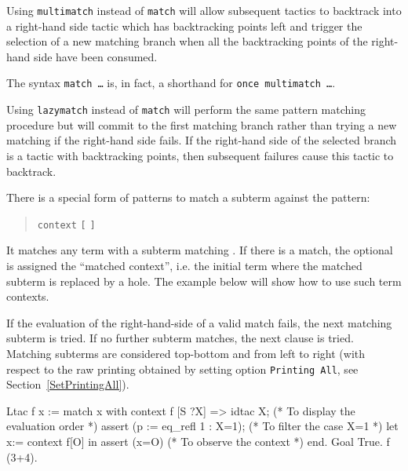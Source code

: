\begin{Variants}

\item {}
Using {\tt multimatch} instead of {\tt match} will allow subsequent
tactics to backtrack into a right-hand side tactic which has
backtracking points left and trigger the selection of a new matching
branch when all the backtracking points of the right-hand side have
been consumed.

The syntax {\tt match \ldots} is, in fact, a shorthand for
{\tt once multimatch \ldots}.

\item {}
Using {\tt lazymatch} instead of {\tt match} will perform the same
pattern matching procedure but will commit to the first matching
branch rather than trying a new matching if the right-hand side
fails. If the right-hand side of the selected branch is a tactic with
backtracking points, then subsequent failures cause this tactic to
backtrack.

\item {}
There is a special form of patterns to match a subterm against the
pattern:
\begin{quote}
{\tt context} {\ident} {\tt [} {\cpattern} {\tt ]}
\end{quote}
It matches any term with a subterm matching {\cpattern}. If there is
a match, the optional {\ident} is assigned the ``matched context'', i.e.
the initial term where the matched subterm is replaced by a
hole. The example below will show how to use such term contexts.

If the evaluation of the right-hand-side of a valid match fails, the
next matching subterm is tried. If no further subterm matches, the
next clause is tried. Matching subterms are considered top-bottom and
from left to right (with respect to the raw printing obtained by
setting option {\tt Printing All}, see Section~\ref{SetPrintingAll}).

\begin{coq_example}
Ltac f x :=
  match x with
    context f [S ?X] =>
    idtac X;                    (* To display the evaluation order *)
    assert (p := eq_refl 1 : X=1);    (* To filter the case X=1 *)
    let x:= context f[O] in assert (x=O) (* To observe the context *)
  end.
Goal True.
f (3+4).
\end{coq_example}


\end{Variants}
